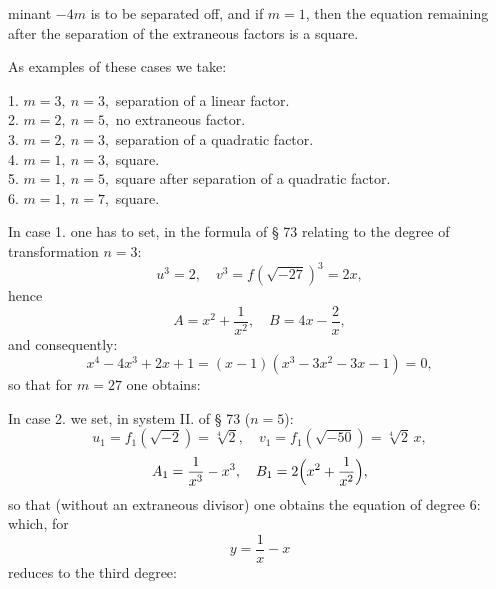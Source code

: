 minant $-4m$ is to be separated off, and if $m=1$, then the
equation remaining after the separation of the extraneous
factors is a square.

As examples of these cases we take:

1. \quad $m=3,\ n=3,$ \quad separation of a linear factor.\\
2. \quad $m=2,\ n=5,$ \quad no extraneous factor.\\
3. \quad $m=2,\ n=3,$ \quad separation of a quadratic factor.\\
4. \quad $m=1,\ n=3,$ \quad square.\\
5. \quad $m=1,\ n=5,$ \quad square after separation of a quadratic factor.\\
6. \quad $m=1,\ n=7,$ \quad square.

In case 1. one has to set, in the formula of § 73 relating to the
degree of transformation $n=3$:
\[
u^3=2,\quad v^3=f(\sqrt{-27})^3=2x,
\]
hence
\[
A=x^2+\frac{1}{x^2},\quad B=4x-\frac{2}{x},
\]
and consequently:
\[
x^4-4x^3+2x+1=(x-1)(x^3-3x^2-3x-1)=0,
\]
so that for $m=27$ one obtains:

In case 2. we set, in system II. of § 73 ($n=5$):
\[
u_1=f_1(\sqrt{-2})=\sqrt[4]{2},\quad v_1=f_1(\sqrt{-50})=\sqrt[4]{2}\,x,
\]
\[
A_1=\frac{1}{x^3}-x^3,\quad B_1=2\Bigl(x^2+\frac{1}{x^2}\Bigr),
\]
so that (without an extraneous divisor) one obtains the equation of degree 6:
which, for
\[
y=\frac{1}{x}-x
\]
reduces to the third degree:
